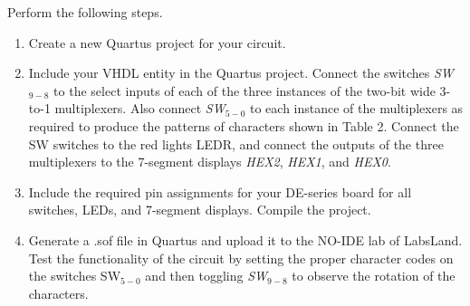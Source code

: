 \documentclass[epsfig,10pt,fullpage]{article}
\begin{document}
Perform the following steps.
\begin{enumerate}
\item Create a new Quartus  project for your circuit.
\item Include your VHDL entity in the Quartus  project. Connect the switches 
{\it SW}$_{9-8}$ to the select inputs of each of the three instances of the two-bit 
wide 3-to-1 multiplexers. Also connect {\it SW}$_{5-0}$ to each instance of the
multiplexers as required to produce the patterns of characters shown in Table 2.
Connect the SW switches to the red lights LEDR, and connect the outputs of the three 
multiplexers to the 7-segment displays {\it HEX2}, {\it HEX1}, and {\it HEX0}.
\item Include the required pin assignments for your DE-series board for all switches, LEDs, 
and 7-segment displays. Compile the project.
\item Generate a .sof file in Quartus and upload it to the NO-IDE lab of LabsLand. Test the functionality of the 
circuit by setting the proper character codes on the switches SW$_{5-0}$ and then 
toggling {\it SW}$_{9-8}$ to observe the rotation of the characters.
\end{enumerate}
\end{document}
